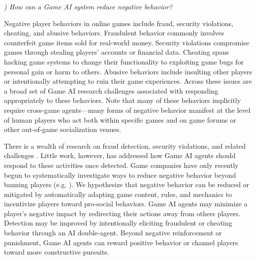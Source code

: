 \documentclass[conference]{IEEEtran}
\newcounter{questionno}
\newcommand{\subsubsectionx}[1]{{\em {\arabic{questionno}) #1}}
	\addtocounter{questionno}{1}
	}
\begin{document}
\subsubsectionx{How can a Game AI system reduce negative behavior?}
%
Negative player behaviors in online games include fraud, security violations, cheating, and abusive behaviors. 
Fraudulent behavior commonly involves counterfeit game items sold for real-world money. 
Security violations compromise games through stealing players' accounts or financial data.
Cheating spans hacking game systems to change their functionality to exploiting game bugs for personal gain or harm to others. 
Abusive behaviors include insulting other players or intentionally attempting to ruin their game experiences. 
Across these issues are a broad set of Game AI research challenges associated with responding appropriately to these behaviors. 
Note that many of these behaviors implicitly require cross-game agents---many forms of negative behavior manifest at the level of human players who act both within specific games and on game forums or other out-of-game socialization venues.

There is a wealth of research on fraud detection, security violations, and related challenges \cite{phua2010:fraud-detection-review}. 
Little work, however, has addressed how Game AI agents should respond to these activities once detected. 
Game companies have only recently begun to systematically investigate ways to reduce negative behavior beyond banning players (e.g. \cite{lin2013:toxic-behav}). 
%
%
We hypothesize that negative behavior can be reduced or mitigated by automatically adapting game content, rules, and mechanics to incentivize players toward pro-social behaviors.
Game AI agents may minimize a player's negative impact by redirecting their actions away from others players. 
Detection may be improved by intentionally eliciting fraudulent or cheating behavior through an AI double-agent.  
Beyond negative reinforcement or punishment, Game AI agents can reward positive behavior or channel players toward more constructive pursuits.
\end{document}
